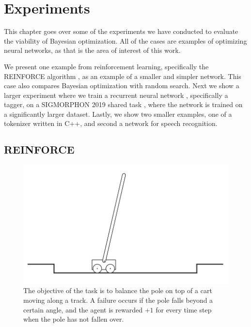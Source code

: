 \chapter{Experiments}
\label{chapter:experiments}

This chapter goes over some of the experiments we have conducted to evaluate the viability of Bayesian optimization. All of the cases are examples of optimizing neural networks, as that is the area of interest of this work.

We present one example from reinforcement learning, specifically the REINFORCE algorithm \citep{suttonbarto2018reinforcement}, as an example of a smaller and simpler network. This case also compares Bayesian optimization with random search. Next we show a larger experiment where we train a recurrent neural network \citep{dlbook}, specifically a tagger, on a SIGMORPHON 2019 shared task \citep{sigmorphon2019task2}, where the network is trained on a significantly larger dataset. Lastly, we show two smaller examples, one of a tokenizer written in C++, and second a network for speech recognition.

\section{REINFORCE}
\label{section:experiments-empirical-bayes}

\begin{figure}
	\begin{center}
		\includegraphics[width=1.0\textwidth]{images/cartpole.png}
		\caption{The objective of the task is to balance the pole on top of a cart moving along
			a track. A failure occurs if the pole falls beyond a certain angle, and the agent
			is rewarded $+1$ for every time step when the pole has not fallen over.}
		\label{figure:cartpole}
	\end{center}
\end{figure}

